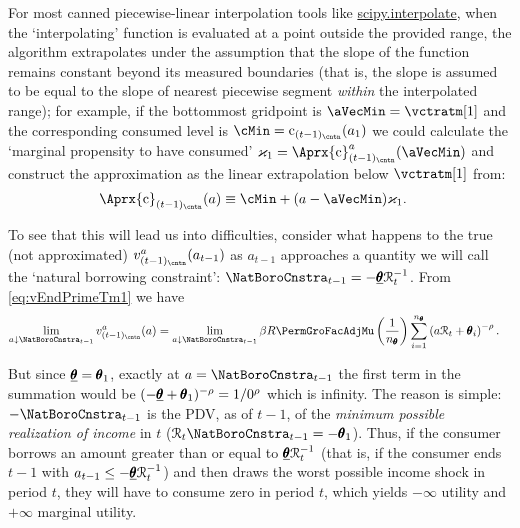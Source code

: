\documentclass[titlepage, headings=optiontotocandhead]{Resources/texmf-local/tex/latex/econtex}
\begin{document}
For most canned piecewise-linear interpolation tools like \href{https://docs.scipy.org/doc/scipy/tutorial/interpolate.html}{scipy.interpolate}, when the `interpolating' function is evaluated at a point outside the provided range, the algorithm extrapolates under the assumption that the slope of the function remains constant beyond its measured boundaries (that is, the slope is assumed to be equal to the slope of nearest piecewise segment \emph{within} the interpolated range); for example, if the bottommost gridpoint is $\aVecMin = \vctratm[1]$ and the corresponding consumed level is $\cMin = \cFunc_{(t-1)_\cntn}(a_1)$ we could calculate the `marginal propensity to have consumed' $\varkappa_{1}=
\Aprx{\cFunc}_{(t-1)_\cntn}^{a}(\aVecMin)$ and construct the approximation as the linear extrapolation below $\vctratm[1]$ from:
\begin{equation}\begin{gathered}\begin{aligned}
      \Aprx{\cFunc}_{(t-1)_\cntn}(a)  &  \equiv \cMin + (a-\aVecMin)\varkappa_{1}  \label{eq:ExtrapLin}.
    \end{aligned}\end{gathered}\end{equation}

To see that this will lead us into difficulties, consider what happens to the true (not approximated) $v^{a}_{(t-1)_\cntn}(a_{t-1})$ as $a_{t-1}$ approaches a quantity we will call the `natural borrowing constraint': $\NatBoroCnstra_{t-1}=-\underline{\TranShkEmp}\RNrm_{t}^{-1}$.  From
\eqref{eq:vEndPrimeTm1} we have
\begin{equation}\begin{gathered}\begin{aligned}
      \lim_{a \downarrow \NatBoroCnstra_{t-1}} v^{a}_{(t-1)_\cntn}(a)
      & =                                                                                         \lim_{a \downarrow \NatBoroCnstra_{t-1}} \beta R \PermGroFacAdjMu \left(\frac{1}{n_{\TranShkEmp}}\right) \sum_{i=1}^{n_{\TranShkEmp}} \left( a \RNrm_{t}+ \TranShkEmp_{i}\right)^{-\rho}.
    \end{aligned}\end{gathered}\end{equation}

But since $\underline{\pmb{\theta}}=\pmb{\theta}_{1}$, exactly at $a=\NatBoroCnstra_{t-1}$ the first term in the summation would be $(-\underline{\pmb{\theta}}+\pmb{\theta}_{1})^{-\rho}=1/0^{\rho}$ which is infinity.  The reason is simple: $-\NatBoroCnstra_{t-1}$ is the PDV, as of $t-1$, of the \emph{minimum possible realization of income} in $t$ ($\RNrm_{t}\NatBoroCnstra_{t-1} = -\TranShkEmp_{1}$).  Thus, if the consumer borrows an amount greater than or equal to $\underline{\pmb{\theta}}\mathcal{R}_{t}^{-1}$ (that is, if the consumer ends $t-1$ with $a_{t-1} \leq -\underline{\pmb{\theta}}\mathcal{R}_{t}^{-1}$) and then draws the worst possible income shock in period $t$, they will have to consume zero in period $t$, which yields $-\infty$ utility and $+\infty$ marginal utility.
\end{document}
